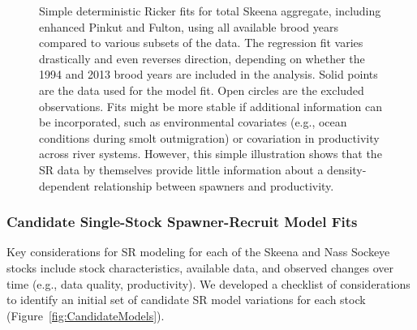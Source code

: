 \documentclass[french,11pt]{book}
\begin{document}
\clearpage


\begin{figure}[htb]

{\centering {} 

}

\caption{Simple deterministic Ricker fits for total Skeena aggregate, including enhanced Pinkut and Fulton, using all available brood years compared to various subsets of the data. The regression fit varies drastically and even reverses direction, depending on whether the 1994 and 2013 brood years are included in the analysis. Solid points are the data used for the model fit. Open circles are the excluded observations. Fits might be more stable if additional information can be incorporated, such as environmental covariates (e.g., ocean conditions during smolt outmigration) or covariation in productivity across river systems. However, this simple illustration shows that the SR data by themselves provide little information about a density-dependent relationship between spawners and productivity.}\label{fig:AltFitPlotSkeena}
\end{figure}
\clearpage

\subsubsection{Candidate Single-Stock Spawner-Recruit Model Fits}\label{CandidateStockModels}

Key considerations for SR modeling for each of the Skeena and Nass Sockeye stocks include stock characteristics, available data, and observed changes over time (e.g., data quality, productivity). We developed a checklist of considerations to identify an initial set of candidate SR model variations for each stock (Figure~\ref{fig:CandidateModels}).
\end{document}

